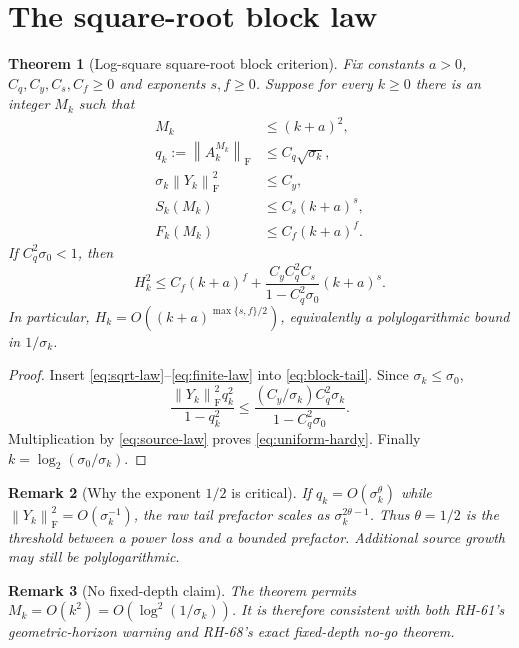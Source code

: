 \documentclass[11pt]{article}
\newtheorem{theorem}{Theorem}[section]
\newtheorem{remark}[theorem]{Remark}
\newcommand{\norm}[1]{\left\lVert#1\right\rVert}
\newcommand{\F}{\mathrm F}
\begin{document}
\section{The square-root block law}

\begin{theorem}[Log-square square-root block criterion]
\label{thm:criterion}
Fix constants $a>0$, $C_q,C_y,C_s,C_f\ge0$ and exponents $s,f\ge0$.
Suppose for every $k\ge0$ there is an integer $M_k$ such that
\begin{align}
 M_k&\le(k+a)^2,
 \label{eq:horizon-law}\\
 q_k:=\norm{A_k^{M_k}}_{\F}&\le C_q\sqrt{\sigma_k},
 \label{eq:sqrt-law}\\
 \sigma_k\norm{Y_k}_{\F}^2&\le C_y,
 \label{eq:observation-law}\\
 S_k(M_k)&\le C_s(k+a)^s,
 \label{eq:source-law}\\
 F_k(M_k)&\le C_f(k+a)^f.
 \label{eq:finite-law}
\end{align}
If $C_q^2\sigma_0<1$, then
\begin{equation}
 H_k^2\le C_f(k+a)^f
 +\frac{C_yC_q^2C_s}{1-C_q^2\sigma_0}(k+a)^s.
 \label{eq:uniform-hardy}
\end{equation}
In particular,
$H_k=O((k+a)^{\max\{s,f\}/2})$, equivalently a polylogarithmic bound in
$1/\sigma_k$.
\end{theorem}

\begin{proof}
Insert \eqref{eq:sqrt-law}--\eqref{eq:finite-law} into
\eqref{eq:block-tail}.  Since $\sigma_k\le\sigma_0$,
\[
 \frac{\norm{Y_k}_{\F}^2q_k^2}{1-q_k^2}
 \le\frac{(C_y/\sigma_k)C_q^2\sigma_k}
 {1-C_q^2\sigma_0}.
\]
Multiplication by \eqref{eq:source-law} proves
\eqref{eq:uniform-hardy}.  Finally
$k=\log_2(\sigma_0/\sigma_k)$.
\end{proof}

\begin{remark}[Why the exponent $1/2$ is critical]
If $q_k=O(\sigma_k^\theta)$ while
$\norm{Y_k}_{\F}^2=O(\sigma_k^{-1})$, the raw tail prefactor scales as
$\sigma_k^{2\theta-1}$.  Thus $\theta=1/2$ is the threshold between a power
loss and a bounded prefactor.  Additional source growth may still be
polylogarithmic.
\end{remark}

\begin{remark}[No fixed-depth claim]
The theorem permits $M_k=O(k^2)=O(\log^2(1/\sigma_k))$.  It is therefore
consistent with both RH-61's geometric-horizon warning and RH-68's exact
fixed-depth no-go theorem.
\end{remark}
\end{document}
